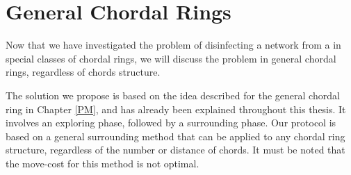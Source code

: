 \chapter {General Chordal Rings}
\label{GL}
Now that we have investigated the problem of disinfecting a network from a  \bv   in   special  classes of chordal rings, we will discuss the problem in general chordal rings, regardless of chords structure.  


The solution  we propose is based on the  idea described for the general chordal ring in Chapter \ref{PM}, and has already been explained throughout this thesis. It involves an exploring phase, followed by a surrounding phase. Our protocol is based on a general surrounding method that can be applied to any chordal ring structure, regardless of the number or distance of chords. It must be noted that the move-cost for this method is not optimal.

 


